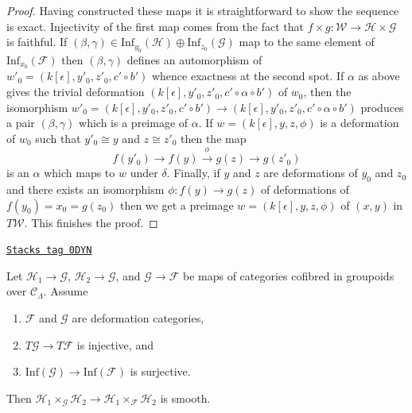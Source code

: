\begin{proof}
\medskip\noindent
Having constructed these maps it is straightforward to show the sequence
is exact. Injectivity of the first map comes from the fact that
$f \times g : \mathcal{W} \to \mathcal{H} \times \mathcal{G}$
is faithful. If
$(\beta, \gamma) \in
\text{Inf}_{y_0}(\mathcal{H}) \oplus \text{Inf}_{z_0}(\mathcal{G})$
map to the same element of $\text{Inf}_{x_0}(\mathcal{F})$ then
$(\beta, \gamma)$ defines an automorphism of
$w'_0 = (k[\epsilon], y'_0, z'_0, c' \circ b')$ whence exactness
at the second spot. If $\alpha$ as above gives the trivial deformation
$(k[\epsilon], y'_0, z'_0, c' \circ \alpha \circ b')$
of $w_0$, then the isomorphism
$w'_0 = (k[\epsilon], y'_0, z'_0, c' \circ b') \to
(k[\epsilon], y'_0, z'_0, c' \circ \alpha \circ b')$
produces a pair $(\beta, \gamma)$ which is a preimage of $\alpha$.
If $w = (k[\epsilon], y, z, \phi)$ is a deformation of $w_0$
such that $y'_0 \cong y$ and $z \cong z'_0$ then the map
$$
f(y'_0) \to f(y) \xrightarrow{\phi} g(z) \to g(z'_0)
$$
is an $\alpha$ which maps to $w$ under $\delta$.
Finally, if $y$ and $z$ are deformations of $y_0$ and $z_0$
and there exists an isomorphism $\phi : f(y) \to g(z)$ of deformations
of $f(y_0) = x_0 = g(z_0)$ then we get a preimage
$w = (k[\epsilon], y, z, \phi)$ of $(x, y)$ in $T\mathcal{W}$.
This finishes the proof.
\end{proof}

\begin{lemma}
\label{formal-defos-lemma-map-fibre-products-smooth}
\href{https://stacks.math.columbia.edu/tag/0DYN}{\texttt{Stacks tag 0DYN}}

Let $\mathcal{H}_1 \to \mathcal{G}$, $\mathcal{H}_2 \to \mathcal{G}$, and
$\mathcal{G} \to \mathcal{F}$ be maps of categories cofibred in groupoids
over $\mathcal{C}_\Lambda$. Assume
\begin{enumerate}
\item $\mathcal{F}$ and $\mathcal{G}$ are deformation categories,
\item $T\mathcal{G} \to T\mathcal{F}$ is injective, and
\item $\text{Inf}(\mathcal{G}) \to \text{Inf}(\mathcal{F})$ is surjective.
\end{enumerate}
Then $\mathcal{H}_1 \times_\mathcal{G} \mathcal{H}_2 \to
\mathcal{H}_1 \times_\mathcal{F} \mathcal{H}_2$ is smooth.
\end{lemma}

